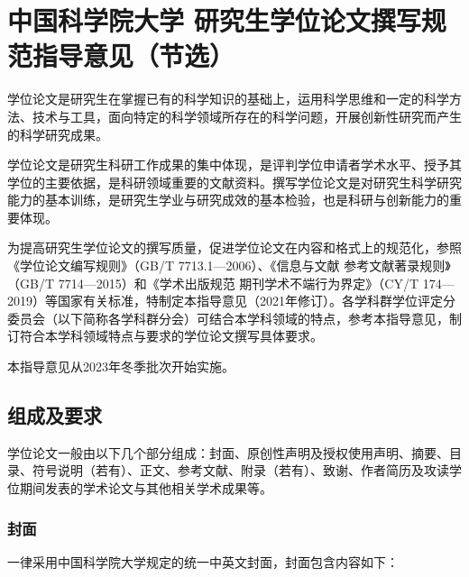 \chapter{中国科学院大学
研究生学位论文撰写规范指导意见（节选）}{
{
\let\cleardoublepage\relax
}
学位论文是研究生在掌握已有的科学知识的基础上，运用科学思维和一定的科学方法、技术与工具，面向特定的科学领域所存在的科学问题，开展创新性研究而产生的科学研究成果。

学位论文是研究生科研工作成果的集中体现，是评判学位申请者学术水平、授予其学位的主要依据，是科研领域重要的文献资料。撰写学位论文是对研究生科学研究能力的基本训练，是研究生学业与研究成效的基本检验，也是科研与创新能力的重要体现。

为提高研究生学位论文的撰写质量，促进学位论文在内容和格式上的规范化，参照《学位论文编写规则》（GB/T 7713.1—2006）、《信息与文献 参考文献著录规则》（GB/T 7714—2015）和《学术出版规范 期刊学术不端行为界定》（CY/T 174—2019）等国家有关标准，特制定本指导意见（2021年修订）。各学科群学位评定分委员会（以下简称各学科群分会）可结合本学科领域的特点，参考本指导意见，制订符合本学科领域特点与要求的学位论文撰写具体要求。

本指导意见从2023年冬季批次开始实施。

\section{组成及要求}
学位论文一般由以下几个部分组成：封面、原创性声明及授权使用声明、摘要、目录、符号说明（若有）、正文、参考文献、附录（若有）、致谢、作者简历及攻读学位期间发表的学术论文与其他相关学术成果等。
\subsection{封面}
一律采用中国科学院大学规定的统一中英文封面，封面包含内容如下：

}
